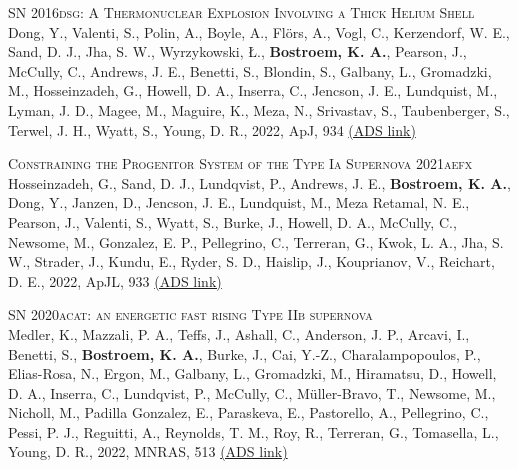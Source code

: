 \begin{revnumerate}[67]
    \item{\textsc{SN 2016dsg: A Thermonuclear Explosion Involving a Thick Helium Shell}\\ 
    Dong, Y., Valenti, S., Polin, A., Boyle, A., Flörs, A., Vogl, C., Kerzendorf, W. E., Sand, D. J., Jha, S. W., Wyrzykowski, Ł., \textbf{Bostroem, K. A.}, Pearson, J., McCully, C., Andrews, J. E., Benetti, S., Blondin, S., Galbany, L., Gromadzki, M., Hosseinzadeh, G., Howell, D. A., Inserra, C., Jencson, J. E., Lundquist, M., Lyman, J. D., Magee, M., Maguire, K., Meza, N., Srivastav, S., Taubenberger, S., Terwel, J. H., Wyatt, S., Young, D. R., 2022, ApJ, 934 
    \color{blue}\href{https://ui.adsabs.harvard.edu/abs/2022ApJ...934..102D}{(ADS link)}\color{black}}\\
    
    \item{\textsc{Constraining the Progenitor System of the Type Ia Supernova 2021aefx}\\ 
    Hosseinzadeh, G., Sand, D. J., Lundqvist, P., Andrews, J. E., \textbf{Bostroem, K. A.}, Dong, Y., Janzen, D., Jencson, J. E., Lundquist, M., Meza Retamal, N. E., Pearson, J., Valenti, S., Wyatt, S., Burke, J., Howell, D. A., McCully, C., Newsome, M., Gonzalez, E. P., Pellegrino, C., Terreran, G., Kwok, L. A., Jha, S. W., Strader, J., Kundu, E., Ryder, S. D., Haislip, J., Kouprianov, V., Reichart, D. E., 2022, ApJL, 933 
    \color{blue}\href{https://ui.adsabs.harvard.edu/abs/2022ApJ...933L..45H}{(ADS link)}\color{black}}\\
    
    \item{\textsc{SN 2020acat: an energetic fast rising Type IIb supernova}\\ 
    Medler, K., Mazzali, P. A., Teffs, J., Ashall, C., Anderson, J. P., Arcavi, I., Benetti, S., \textbf{Bostroem, K. A.}, Burke, J., Cai, Y.-Z., Charalampopoulos, P., Elias-Rosa, N., Ergon, M., Galbany, L., Gromadzki, M., Hiramatsu, D., Howell, D. A., Inserra, C., Lundqvist, P., McCully, C., M\"{u}ller-Bravo, T., Newsome, M., Nicholl, M., Padilla Gonzalez, E., Paraskeva, E., Pastorello, A., Pellegrino, C., Pessi, P. J., Reguitti, A., Reynolds, T. M., Roy, R., Terreran, G., Tomasella, L., Young, D. R., 2022, MNRAS, 513 
    \color{blue}\href{https://ui.adsabs.harvard.edu/abs/2022MNRAS.513.5540M}{(ADS link)}\color{black}}\\
    


    


\end{revnumerate}
